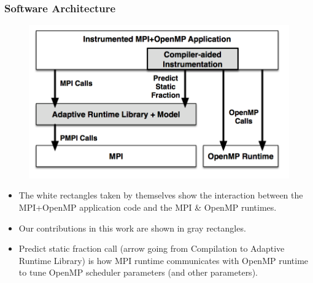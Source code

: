 

\begin{frame}[label=softwareArch]
\frametitle{Software Architecture}
\begin{figure}[ht!]
\begin{center}
\label{code:architecture}
\includegraphics[scale=0.56]{images/architecture.png}
\end{center}
\end{figure}
\begin{itemize}
\tiny \item \tiny The white rectangles taken by themselves show the interaction between the MPI+OpenMP application code and the
MPI \& OpenMP runtimes.
\item \tiny Our contributions in this work are shown in gray rectangles. %
\item \tiny Predict static fraction call (arrow going from Compilation to Adaptive Runtime Library) is how MPI runtime communicates with OpenMP runtime to tune OpenMP scheduler parameters (and other parameters).
\end{itemize}
\end{frame} 



